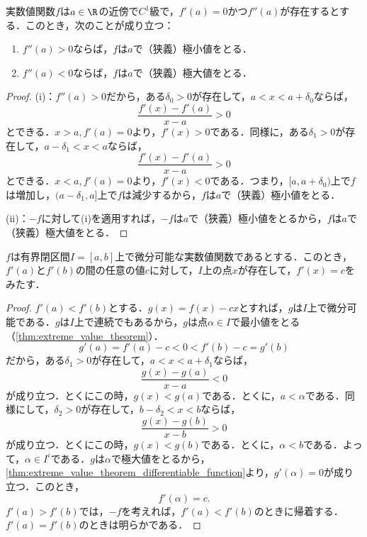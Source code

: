 \documentclass[a4paper,10pt]{ltjsarticle}
\begin{document}
\begin{MyTheorem}
  実数値関数\(f\)は\(a\in\R\)の近傍で\(C^1\)級で，\(f'(a) = 0\)かつ\(f''(a)\)が存在するとする．このとき，次のことが成り立つ：
  \begin{enumerate}
    \item \(f''(a) > 0\)ならば，\(f\)は\(a\)で（狭義）極小値をとる．
    \item \(f''(a) < 0\)ならば，\(f\)は\(a\)で（狭義）極大値をとる．
  \end{enumerate}
\end{MyTheorem}
\begin{proof}
  (i)：\(f''(a)>0\)だから，ある\(\delta_0 > 0\)が存在して，\(a < x < a + \delta_0\)ならば，
  \[ \frac{f'(x) - f'(a)}{x - a} > 0 \]
  とできる．\(x > a, f'(a) = 0\)より，\(f'(x) > 0\)である．同様に，ある\(\delta_1 > 0\)が存在して，\(a - \delta_1 < x < a\)ならば，
  \[ \frac{f'(x) - f'(a)}{x - a} > 0 \]
  とできる．\(x < a, f'(a) = 0\)より，\(f'(x) < 0\)である．つまり，\([a, a + \delta_0)\)上で\(f\)は増加し，\((a - \delta_1, a]\)上で\(f\)は減少するから，\(f\)は\(a\)で（狭義）極小値をとる．

  (ii)：\(-f\)に対して(i)を適用すれば，\(-f\)は\(a\)で（狭義）極小値をとるから，\(f\)は\(a\)で（狭義）極大値をとる．
\end{proof}

\begin{MyTheorem}
  \(f\)は有界閉区間\(I=[a, b]\)上で微分可能な実数値関数であるとする．このとき，\(f'(a)\)と\(f'(b)\)の間の任意の値\(c\)に対して，\(I\)上の点\(x\)が存在して，\(f'(x) = c\)をみたす．
\end{MyTheorem}
\begin{proof}
  \(f'(a) < f'(b)\)とする．\(g(x) = f(x) - cx\)とすれば，\(g\)は\(I\)上で微分可能である．\(g\)は\(I\)上で連続でもあるから，\(g\)は点\(\alpha\in I\)で最小値をとる（\cref{thm:extreme_value_theorem}）．
  \[ g'(a) = f'(a) - c < 0 < f'(b) - c = g'(b) \]
  だから，ある\(\delta_1 > 0\)が存在して，\(a < x < a + \delta_1\)ならば，
  \[ \frac{g(x) - g(a)}{x - a} < 0 \]
  が成り立つ．とくにこの時，\(g(x) < g(a)\)である．とくに，\(a < \alpha\)である．同様にして，\(\delta_2 > 0\)が存在して，\(b - \delta_2 < x < b\)ならば，
  \[ \frac{g(x) - g(b)}{x - b} > 0 \]
  が成り立つ．とくにこの時，\(g(x) < g(b)\)である．とくに，\(\alpha < b\)である．よって，\(\alpha \in I^i\)である．\(g\)は\(\alpha\)で極大値をとるから，\cref{thm:extreme_value_theorem_differentiable_function}より，\(g'(\alpha) = 0\)が成り立つ．このとき，
  \[ f'(\alpha) = c. \]
  \(f'(a) > f'(b)\)では，\(-f\)を考えれば，\(f'(a) < f'(b)\)のときに帰着する．\(f'(a) = f'(b)\)のときは明らかである．
\end{proof}
\end{document}
